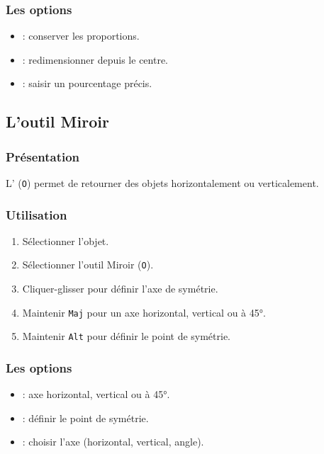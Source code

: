 \subsubsection{Les options}

\begin{itemize}
    \item {} : conserver les proportions.
    \item {} : redimensionner depuis le centre.
    \item {} : saisir un pourcentage précis.
\end{itemize}

\subsection{L'outil Miroir}

\subsubsection{Présentation}

L' (\texttt{O}) permet de retourner des objets horizontalement ou verticalement.

\subsubsection{Utilisation}

\begin{enumerate}
    \item Sélectionner l'objet.
    \item Sélectionner l'outil Miroir (\texttt{O}).
    \item Cliquer-glisser pour définir l'axe de symétrie.
    \item Maintenir \texttt{Maj} pour un axe horizontal, vertical ou à 45°.
    \item Maintenir \texttt{Alt} pour définir le point de symétrie.
\end{enumerate}

\subsubsection{Les options}

\begin{itemize}
    \item {} : axe horizontal, vertical ou à 45°.
    \item {} : définir le point de symétrie.
    \item {} : choisir l'axe (horizontal, vertical, angle).
\end{itemize}

